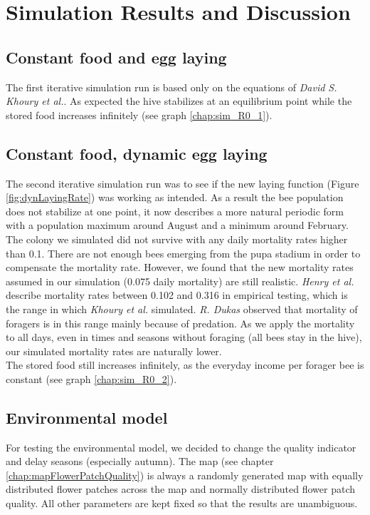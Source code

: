 \section{Simulation Results and Discussion}

\subsection{Constant food and egg laying}
	\label{chap:constantFoodConstantLaying}
	The first iterative simulation run is based only on the equations of \textit{David S. Khoury et al.}\cite{khoury13}. As expected the hive stabilizes at an equilibrium point while the stored food increases infinitely (see graph \ref{chap:sim_R0_1}).

\subsection{Constant food, dynamic egg laying}
	\label{chap:constantFoodDynamicLaying}
	The second iterative simulation run was to see if the new laying function (Figure \ref{fig:dynLayingRate})  was working as intended. As a result the bee population does not stabilize at one point, it now describes a more natural periodic form with a population maximum around August and a minimum around February.\\
	
	The colony we simulated did not survive with any daily mortality rates higher than 0.1. There are not enough bees emerging from the pupa stadium in order to compensate the mortality rate. However, we found that the new mortality rates assumed in our simulation (0.075 daily mortality) are still realistic. \textit{Henry et al.} \cite{henry12} describe mortality rates between 0.102 and 0.316 in empirical testing, which is the range in which \textit{Khoury et al.} \cite{khoury13} simulated. \textit{R. Dukas} \cite{dukas08} observed that mortality of foragers is in this range mainly because of predation. As we apply the mortality to all days, even in times and seasons without foraging (all bees stay in the hive), our simulated mortality rates are naturally lower.\\
	
	The stored food still increases infinitely, as the everyday income per forager bee is constant (see graph \ref{chap:sim_R0_2}).

\subsection{Environmental model}
	\label{chap:environmentalModelDiscussion}
	For testing the environmental model, we decided to change the quality indicator and delay seasons (especially autumn). The map (see chapter \ref{chap:mapFlowerPatchQuality}) is always a randomly generated map with equally distributed flower patches across the map and normally distributed flower patch quality. All other parameters are kept fixed so that the results are unambiguous.
	
